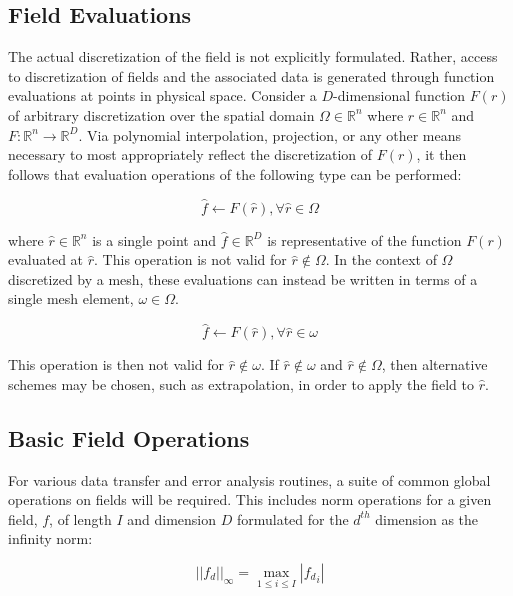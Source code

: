 \documentclass[letterpaper,12pt]{article}
\begin{document}
\subsection{Field Evaluations}\label{subsec:field_eval}
The actual discretization of the field is not explicitly
formulated. Rather, access to discretization of fields and the
associated data is generated through function evaluations at points in
physical space. Consider a $D$-dimensional function $F(r)$ of
arbitrary discretization over the spatial domain $\Omega \in
\mathbb{R}^n$ where $r \in \mathbb{R}^n$ and $F : \mathbb{R}^n
\rightarrow \mathbb{R}^D$. Via polynomial interpolation, projection,
or any other means necessary to most appropriately reflect the
discretization of $F(r)$, it then follows that evaluation operations
of the following type can be performed:

\begin{equation}
  \hat{f} \leftarrow F(\hat{r}), \forall \hat{r} \in \Omega
  \label{eq:evaluation}
\end{equation}

where $\hat{r} \in \mathbb{R}^n$ is a single point and $\hat{f} \in
\mathbb{R}^D$ is representative of the function $F(r)$ evaluated at
$\hat{r}$. This operation is not valid for $\hat{r} \notin \Omega$. In
the context of $\Omega$ discretized by a mesh, these evaluations can
instead be written in terms of a single mesh element, $\omega \in
\Omega$. 

\begin{equation}
  \hat{f} \leftarrow F(\hat{r}), \forall \hat{r} \in \omega
  \label{eq:element_evaluation}
\end{equation}

This operation is then not valid for $\hat{r} \notin \omega$. If
$\hat{r} \notin \omega$ and $\hat{r} \notin \Omega$, then alternative
schemes may be chosen, such as extrapolation, in order to apply the
field to $\hat{r}$.


\subsection{Basic Field Operations}\label{subsec:field_ops}
For various data transfer and error analysis routines, a suite of
common global operations on fields will be required. This includes
norm operations for a given field, $f$, of length $I$ and dimension
$D$ formulated for the $d^{th}$ dimension as the infinity norm:

\begin{equation}
  ||f_d||_\infty = \max_{1 \leq i \leq I} |{f_d}_i|
  \label{eq:infinity_norm}
\end{equation}
\end{document}
